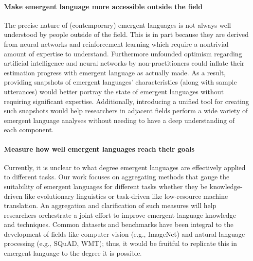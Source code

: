 \paragraph{Make emergent language more accessible outside the field}
The precise nature of (contemporary) emergent languages is not always well understood by people outside of the field.
This is in part because they are derived from neural networks and reinforcement learning which require a nontrivial amount of expertise to understand.
Furthermore unfounded optimism regarding artificial intelligence and neural networks by non-practitioners could inflate their estimation progress with emergent language as actually made.
As a result, providing snapshots of emergent languages' characteristics (along with sample utterances) would better portray the state of emergent languages without requiring significant expertise.
Additionally, introducing a unified tool for creating such snapshots would help researchers in adjacent fields perform a wide variety of emergent language analyses without needing to have a deep understanding of each component.

\paragraph{Measure how well emergent languages reach their goals}
Currently, it is unclear to what degree emergent languages are effectively applied to different tasks.
Our work focuses on aggregating methods that gauge the suitability of emergent languages for different tasks whether they be knowledge-driven like evolutionary linguistics or task-driven like low-resource machine translation.
An aggregation and clarification of such measures will help researchers orchestrate a joint effort to improve emergent language knowledge and techniques.
Common datasets and benchmarks have been integral to the development of fields like computer vision (e.g., ImageNet) and natural language processing (e.g., SQuAD, WMT); thus, it would be fruitful to replicate this in emergent language to the degree it is possible.

